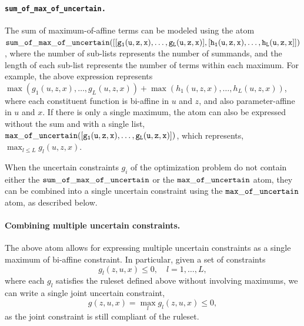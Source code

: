 \paragraph{\tt{sum\_of\_max\_of\_uncertain}.} The sum of maximum-of-affine terms can be modeled using the atom $\tt{sum\_of\_max\_of\_uncertain([[g_{1}(u,z,x),\dots,g_L(u,z,x)],[h_1(u,z,x),\dots,h_L(u,z,x]])}$, where the number of sub-lists represents the number of summands, and the length of each sub-list represents the number of terms within each maximum. For example, the above expression represents $\max(g_{1}(u,z,x),\dots,g_{L}(u,z,x))+ \max(h_{1}(u,z,x),\dots,h_{L}(u,z,x))$, where each constituent function is bi-affine in $u$ and $z$, and also parameter-affine in $u$ and $x$. If there is only a single maximum, the atom can also be expressed without the sum and with a single  list, $\tt{max\_of\_uncertain([g_1(u,z,x),\dots,g_L(u,z,x)])}$, which represents, $\max_{l\leq L} g_l(u,z,x)$.

When the uncertain constraints $g_i$ of the optimization problem do not contain either the $\tt{sum\_of\_max\_of\_uncertain}$ or the $\tt{max\_of\_uncertain}$ atom, they can be combined into a single uncertain constraint using the $\tt{max\_of\_uncertain}$ atom, as described below.

\paragraph{Combining multiple uncertain constraints.}
\label{sec:multiple}
The above atom allows for expressing multiple uncertain constraints as a single maximum of bi-affine constraint. In particular, given a set of constraints
$$g_{l}(z,u,x)\leq 0, \quad l = 1,\dots,L, $$
where each $g_l$ satisfies the ruleset defined above without involving maximums, we can write a single joint uncertain constraint,
\begin{equation}
	\label{multiple_comb}
g(z,u,x) = \max_{l}g_l(z,u,x)\leq 0,
\end{equation}
as the joint constraint is still compliant of the ruleset.

